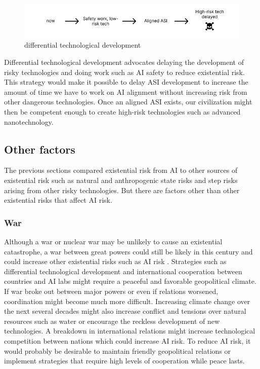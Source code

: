 \documentclass{article}
\begin{document}
\begin{figure}[h]
    \includegraphics[width=12cm]{differential-technological-development}
    \centering
    \caption{differential technological development}
\end{figure}

Differential technological development advocates delaying the development of risky technologies and doing work such as AI safety to reduce existential risk. This strategy would make it possible to delay ASI development to increase the amount of time we have to work on AI alignment without increasing risk from other dangerous technologies. Once an aligned ASI exists, our civilization might then be competent enough to create high-risk technologies such as advanced nanotechnology.

\subsection{Other factors}

The previous sections compared existential risk from AI to other sources of existential risk such as natural and anthropogenic state risks and step risks arising from other risky technologies. But there are factors other than other existential risks that affect AI risk.

\subsubsection{War}

Although a war or nuclear war may be unlikely to cause an existential catastrophe, a war between great powers could still be likely in this century and could increase other existential risks such as AI risk \cite{theprecipice}. Strategies such as differential technological development and international cooperation between countries and AI labs might require a peaceful and favorable geopolitical climate. If war broke out between major powers or even if relations worsened, coordination might become much more difficult. Increasing climate change over the next several decades might also increase conflict and tensions over natural resources such as water or encourage the reckless development of new technologies. A breakdown in international relations might increase technological competition between nations which could increase AI risk. To reduce AI risk, it would probably be desirable to maintain friendly geopolitical relations or implement strategies that require high levels of cooperation while peace lasts.
\end{document}
